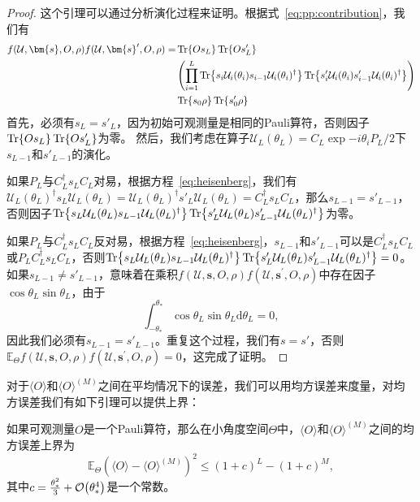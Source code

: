 \begin{proof}
    这个引理可以通过分析演化过程来证明。根据式~\eqref{eq:pp:contribution}，我们有
    \begin{equation}
        \begin{aligned}
            f(\mathcal{U},\bm{s},O,\rho)f(\mathcal{U},\bm{s}^{\prime},O,\rho)=&\Tr{Os_L}\Tr{Os'_L}\\
            &\left(\prod_{i=1}^{L}\Tr{s_i\mathcal{U}_i(\theta_i) s_{i-1}\mathcal{U}_i(\theta_i)^\dagger}\Tr{s'_i\mathcal{U}_i(\theta_i) s'_{i-1}\mathcal{U}_i(\theta_i)^\dagger}\right)\\
            &\Tr{s_0 \rho}\Tr{s'_0 \rho}
        \end{aligned}
    \end{equation}
    首先，必须有$s_L=s'_L$，因为初始可观测量是相同的Pauli算符，否则因子$\Tr{Os_L}\Tr{Os'_L}$为零。
    然后，我们考虑在算子$\mathcal{U}_L(\theta_L)=C_L\exp{-i \theta_i P_L / 2}$下$s_{L-1}$和$s'_{L-1}$的演化。

    如果$P_L$与$C_L^\dagger s_L C_L$对易，根据方程~\eqref{eq:heisenberg}，我们有$\mathcal{U}_L(\theta_L)^\dagger s_L \mathcal{U}_L(\theta_L)=\mathcal{U}_L(\theta_L)^\dagger s'_L \mathcal{U}_L(\theta_L) = C_L^\dagger s_L C_L$，那么$s_{L-1}=s'_{L-1}$，否则因子$\Tr{s_L\mathcal{U}_L(\theta_L) s_{L-1}\mathcal{U}_L(\theta_L)^\dagger}\Tr{s'_L\mathcal{U}_L(\theta_L) s'_{L-1}\mathcal{U}_L(\theta_L)^\dagger}$为零。

    如果$P_L$与$C_L^\dagger s_L C_L$反对易，根据方程~\eqref{eq:heisenberg}，$s_{L-1}$和$s'_{L-1}$可以是$C_L^\dagger s_L C_L$或$P_L C_L^\dagger s_L C_L$，否则$\Tr{s_L\mathcal{U}_L(\theta_L) s_{L-1}\mathcal{U}_L(\theta_L)^\dagger}\Tr{s'_L\mathcal{U}_L(\theta_L) s'_{L-1}\mathcal{U}_L(\theta_L)^\dagger}=0$。如果$s_{L-1}\neq s'_{L-1}$，意味着在乘积$f(\mathcal{U},\bm{s},O,\rho)f(\mathcal{U},\bm{s}^{\prime},O,\rho)$中存在因子$\cos{\theta_L}\sin{\theta_L}$，由于
    \begin{equation}
        \int_{-\theta_*}^{\theta_*}\cos{\theta_L}\sin{\theta_L}\mathrm{d}\theta_L=0,
    \end{equation}
    因此我们必须有$s_{L-1}=s'_{L-1}$。重复这个过程，我们有$s=s'$，否则$\mathbb{E}_{\Theta}f(\mathcal{U},\bm{s},O,\rho)f(\mathcal{U},\bm{s}^{\prime},O,\rho)=0$，这完成了证明。
\end{proof}



对于$\langle O \rangle$和$\langle O \rangle ^{(M)}$之间在平均情况下的误差，我们可以用均方误差来度量，对均方误差我们有如下引理可以提供上界：
\begin{lemma}
    如果可观测量$O$是一个Pauli算符，那么在小角度空间$\Theta$中，$\langle O \rangle$和$\langle O \rangle ^{(M)}$之间的均方误差上界为
    \begin{equation}
        \mathbb{E}_{\Theta}\left(\langle O \rangle - \langle O \rangle ^{(M)}\right)^2 \leq  \left(1+c\right)^L - \left(1+c\right)^M,
    \end{equation}
    其中$c=\frac{\theta_*^2}{3}+\order{\theta_*^4}$是一个常数。
\end{lemma}

